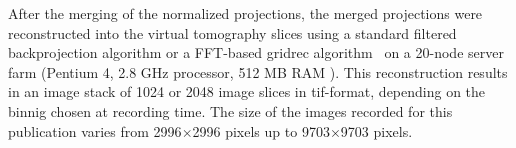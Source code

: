 After the merging of the normalized projections, the merged projections were reconstructed into the virtual tomography slices using a standard filtered backprojection algorithm or a FFT-based gridrec algorithm~\cite{Dowd1999} on a 20-node server farm (Pentium 4, 2.8 GHz processor, 512 MB RAM ). This reconstruction results in an image stack of 1024 or 2048 image slices in tif-format, depending on the binnig chosen at recording time. The size of the images recorded for this publication varies from 2996$\times$2996 pixels up to 9703$\times$9703 pixels.
